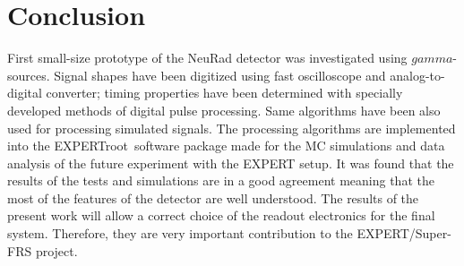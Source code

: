 \documentclass{webofc}
\newcommand{\er}{\textmd{EXPERTroot}}
\begin{document}
	
	
	


\section{Conclusion}
	
	First small-size prototype of the NeuRad detector was investigated using $gamma$-sources. Signal shapes have been digitized using fast oscilloscope and analog-to-digital converter; timing properties have been determined with specially developed methods of digital pulse processing. Same algorithms have been also used for processing simulated signals. The processing algorithms are implemented into the \er\, software package made for the MC simulations and data analysis of the future experiment with the EXPERT setup. It was found that the results of the tests and simulations are in a good agreement meaning that the most of the features of the detector are well understood. The results of the present work will allow a correct choice of the readout electronics for the final system. Therefore, they are very important contribution to the EXPERT/Super-FRS project.
	
	
	
	
	
\end{document}
